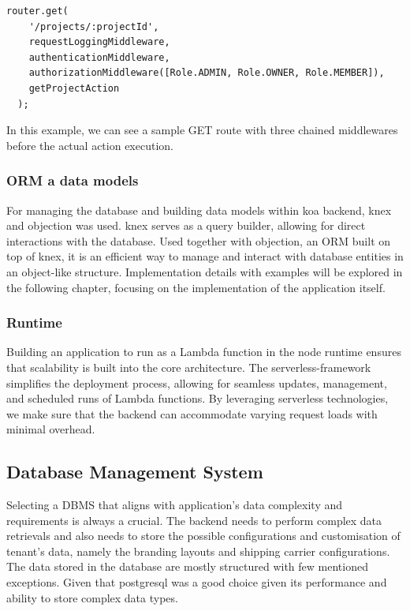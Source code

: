 \medskip
\begin{lstlisting}[caption=Koa router example]
  router.get(
    '/projects/:projectId',
    requestLoggingMiddleware,
    authenticationMiddleware,
    authorizationMiddleware([Role.ADMIN, Role.OWNER, Role.MEMBER]),
    getProjectAction
  );
\end{lstlisting}

In this example, we can see a sample GET route with three chained middlewares before the actual action execution.


\subsubsection{ORM a data models}
For managing the database and building data models within \gls{koa} backend, \gls{knex} and \gls{objection} was used.
\gls{knex} serves as a query builder, allowing for direct interactions with the database.
Used together with \gls{objection}, an \ac{ORM} built on top of \gls{knex}, it is an efficient way to manage and interact with database entities in an object-like structure.
Implementation details with examples will be explored in the following chapter, focusing on the implementation of the application itself.


\subsubsection{Runtime}
Building an application to run as a Lambda function in the \gls{node} runtime ensures that scalability is built into the core architecture.
The \gls{serverless-framework} simplifies the deployment process, allowing for seamless updates, management, and scheduled runs of Lambda functions.
By leveraging serverless technologies, we make sure that the backend can accommodate varying request loads with minimal overhead.


\subsection{Database Management System}
\label{subsec:dbms}
Selecting a \ac{DBMS} that aligns with application's data complexity and requirements is always a crucial. 
The backend needs to perform complex data retrievals and also needs to store the possible configurations and customisation of tenant's data, namely the branding layouts and shipping carrier configurations.
The data stored in the database are mostly structured with few mentioned exceptions.
Given that \gls{postgresql} was a good choice given its performance and ability to store complex data types.

